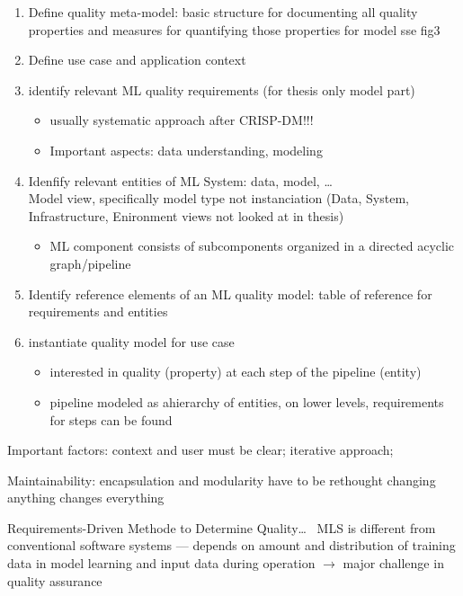 \begin{enumerate}
    \item Define quality meta-model: basic structure for documenting all quality properties and
        measures for quantifying those properties
        for model sse fig3
    \item Define use case and application context
    \item identify relevant ML quality requirements (for thesis only model part)
        \begin{itemize}
            \item usually systematic approach after CRISP-DM!!!
            \item Important aspects: data understanding, modeling
        \end{itemize}
    \item Idenfify relevant entities of ML System: data, model, \ldots\\
        Model view, specifically model type not instanciation (Data, System, Infrastructure,
        Enironment views not looked at in thesis)
        \begin{itemize}
            \item ML component consists of subcomponents organized in a directed acyclic graph/pipeline
        \end{itemize}
    \item Identify reference elements of an ML quality model: table of reference for requirements
        and entities
    \item instantiate quality model for use case\\
        \begin{itemize}
            \item interested in quality (property) at each step of the pipeline (entity)
            \item pipeline modeled as ahierarchy of entities, on lower levels, requirements for steps
                can be found
        \end{itemize}
\end{enumerate}
Important factors: context and user must be clear; iterative approach;

Maintainability:
encapsulation and modularity have to be rethought
changing anything changes everything

Requirements-Driven Methode to Determine Quality\ldots~\cite{nakamichi_requirements-driven_2020}
MLS is different from conventional software systems --- depends on amount and distribution of
training data in model learning and input data during operation $\rightarrow$ major challenge in
quality assurance

